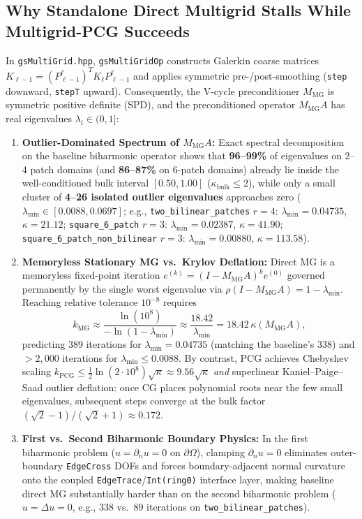 \documentclass[10pt,a4paper]{article}
\begin{document}
\subsection{Why Standalone Direct Multigrid Stalls While Multigrid-PCG Succeeds}
In \texttt{gsMultiGrid.hpp}, \texttt{gsMultiGridOp} constructs Galerkin coarse matrices $K_{\ell-1} = (P_{\ell-1}^\ell)^T K_\ell P_{\ell-1}^\ell$ and applies symmetric pre-/post-smoothing (\texttt{step} downward, \texttt{stepT} upward). Consequently, the V-cycle preconditioner $M_{\text{MG}}$ is symmetric positive definite (SPD), and the preconditioned operator $M_{\text{MG}} A$ has real eigenvalues $\lambda_i \in (0, 1]$:
\begin{enumerate}
  \item \textbf{Outlier-Dominated Spectrum of $M_{\text{MG}} A$:} Exact spectral decomposition on the baseline biharmonic operator shows that \textbf{96--99\%} of eigenvalues on 2--4 patch domains (and \textbf{86--87\%} on 6-patch domains) already lie inside the well-conditioned bulk interval $[0.50, 1.00]$ ($\kappa_{\text{bulk}} \le 2$), while only a small cluster of \textbf{4--26 isolated outlier eigenvalues} approaches zero ($\lambda_{\min} \in [0.0088, 0.0697]$; e.g., \texttt{two\_bilinear\_patches} $r=4$: $\lambda_{\min} = 0.04735$, $\kappa = 21.12$; \texttt{square\_6\_patch} $r=3$: $\lambda_{\min} = 0.02387$, $\kappa = 41.90$; \texttt{square\_6\_patch\_non\_bilinear} $r=3$: $\lambda_{\min} = 0.00880$, $\kappa = 113.58$).
  \item \textbf{Memoryless Stationary MG vs.\ Krylov Deflation:} Direct MG is a memoryless fixed-point iteration $e^{(k)} = (I - M_{\text{MG}}A)^k e^{(0)}$ governed permanently by the single worst eigenvalue via $\rho(I - M_{\text{MG}}A) = 1 - \lambda_{\min}$. Reaching relative tolerance $10^{-8}$ requires
  \[
    k_{\text{MG}} \approx \frac{\ln(10^8)}{-\ln(1 - \lambda_{\min})} \approx \frac{18.42}{\lambda_{\min}} = 18.42\,\kappa(M_{\text{MG}}A),
  \]
  predicting $389$ iterations for $\lambda_{\min} = 0.04735$ (matching the baseline's $338$) and $>2{,}000$ iterations for $\lambda_{\min} \le 0.0088$. By contrast, PCG achieves Chebyshev scaling $k_{\text{PCG}} \le \tfrac{1}{2}\ln(2\cdot 10^8)\sqrt{\kappa} \approx 9.56\sqrt{\kappa}$ \emph{and} superlinear Kaniel--Paige--Saad outlier deflation: once CG places polynomial roots near the few small eigenvalues, subsequent steps converge at the bulk factor $(\sqrt{2}-1)/(\sqrt{2}+1) \approx 0.172$.
  \item \textbf{First vs.\ Second Biharmonic Boundary Physics:} In the first biharmonic problem ($u = \partial_n u = 0$ on $\partial\Omega$), clamping $\partial_n u = 0$ eliminates outer-boundary \texttt{EdgeCross} DOFs and forces boundary-adjacent normal curvature onto the coupled \texttt{EdgeTrace}/\texttt{Int(ring0)} interface layer, making baseline direct MG substantially harder than on the second biharmonic problem ($u = \Delta u = 0$, e.g., $338$ vs.\ $89$ iterations on \texttt{two\_bilinear\_patches}).
\end{enumerate}
\end{document}
